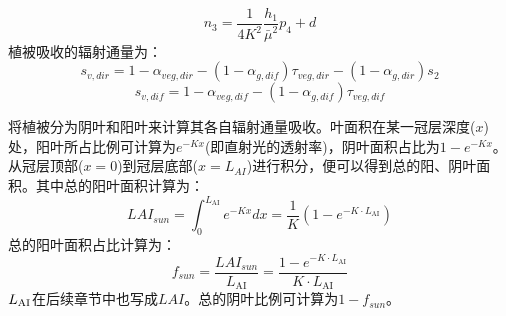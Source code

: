 \begin{equation}
n_{3}=\frac{1}{4 K^{2}} \frac{h_{1}}{\bar{\mu}^{2}} p_{4}+d
\end{equation}
植被吸收的辐射通量为：
\begin{equation}
s_{v, dir}=1-\alpha_{veg, dir}-\left(1-\alpha_{g, dif}\right) \tau_{veg, dir}-\left(1-\alpha_{g, dir}\right) s_{2}
\end{equation}
\begin{equation}
s_{v, dif}=1-\alpha_{veg, dif}-\left(1-\alpha_{g, dif}\right) \tau_{veg, dif}
\end{equation}

\citet{dai2004two} 将植被分为阴叶和阳叶来计算其各自辐射通量吸收。叶面积在某一冠层深度($x$)处，阳叶所占比例可计算为$e^{-Kx}$(即直射光的透射率)，阴叶面积占比为$1-e^{-Kx}$。从冠层顶部($x=0$)到冠层底部($x=L_{AI}$)进行积分，便可以得到总的阳、阴叶面积。其中总的阳叶面积计算为：
\begin{equation}
LAI_{sun}=\int_{0}^{L_{\mathrm{AI}}} e^{-Kx} d x=\frac{1}{K}\left(1-e^{-K \cdot L_{\mathrm{AI}}}\right) 
\end{equation}
总的阳叶面积占比计算为：
\begin{equation}
f_{sun} = \frac {LAI_{sun}} {L_{\mathrm{AI}}} = \frac {1-e^{-K 
 \cdot L_{\mathrm{AI}}}} {K \cdot L_{\mathrm{AI}} } 
\end{equation}
$L_{\rm{AI}}$在后续章节中也写成$LAI$。总的阴叶比例可计算为$1-f_{sun}$。

